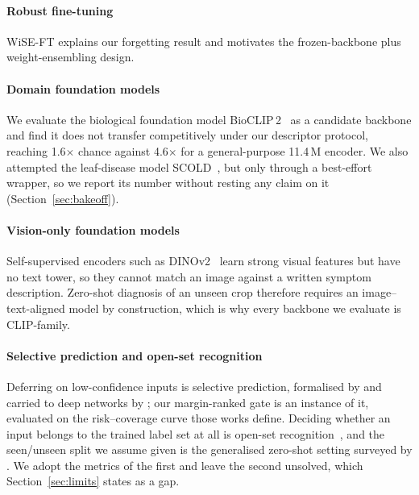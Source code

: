\documentclass[a4paper,fleqn]{cas-dc}
\begin{document}
\paragraph{Robust fine-tuning} WiSE-FT \citep{wortsman2022} explains our forgetting result and
motivates the frozen-backbone plus weight-ensembling design.

\paragraph{Domain foundation models} We evaluate the biological foundation model
BioCLIP\,2~\citep{bioclip2} as a candidate backbone and find it does not transfer competitively under
our descriptor protocol, reaching 1.6$\times$ chance against 4.6$\times$ for a general-purpose
11.4\,M encoder. We also attempted the leaf-disease model SCOLD~\citep{scold2025}, but only through a
best-effort wrapper, so we report its number without resting any claim on it
(Section~\ref{sec:bakeoff}).

\paragraph{Vision-only foundation models} Self-supervised encoders such as
DINOv2~\citep{oquab2024} learn strong visual features but have no text tower, so they cannot match an
image against a written symptom description. Zero-shot diagnosis of an unseen crop therefore requires
an image--text-aligned model by construction, which is why every backbone we evaluate is
CLIP-family.

\paragraph{Selective prediction and open-set recognition} Deferring on low-confidence inputs is
selective prediction, formalised by \citet{elyaniv2010selective} and carried to deep networks by
\citet{geifman2017selective}; our margin-ranked gate is an instance of it, evaluated on the
risk--coverage curve those works define. Deciding whether an input belongs to the trained label set
at all is open-set recognition~\citep{scheirer2013openset}, and the seen/unseen split we assume
given is the generalised zero-shot setting surveyed by \citet{xian2019gzsl}. We adopt the metrics
of the first and leave the second unsolved, which Section~\ref{sec:limits} states as a gap.
\end{document}
